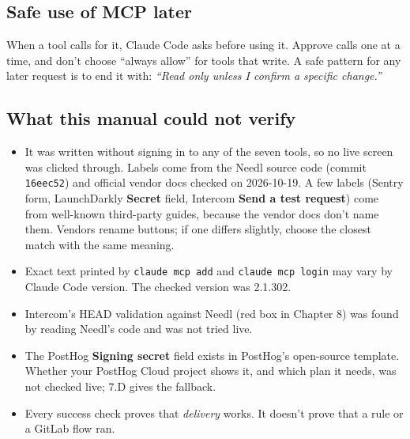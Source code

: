 \documentclass[11pt,a4paper]{article}
\newcommand{\ui}[1]{\textbf{#1}}
\newcommand{\lit}[1]{\texttt{#1}}
\begin{document}
\subsection{Safe use of MCP later}
When a tool calls for it, Claude Code asks before using it. Approve calls one at a time, and don't choose “always allow” for tools that write. A safe pattern for any later request is to end it with: \emph{“Read only unless I confirm a specific change.”}

\subsection{What this manual could not verify}
\begin{itemize}
\item It was written without signing in to any of the seven tools, so no live screen was clicked through. Labels come from the Needl source code (commit \lit{16eec52}) and official vendor docs checked on 2026-10-19. A few labels (Sentry form, LaunchDarkly \ui{Secret} field, Intercom \ui{Send a test request}) come from well-known third-party guides, because the vendor docs don't name them. Vendors rename buttons; if one differs slightly, choose the closest match with the same meaning.
\item Exact text printed by \lit{claude mcp add} and \lit{claude mcp login} may vary by Claude Code version. The checked version was 2.1.302.
\item Intercom's HEAD validation against Needl (red box in Chapter 8) was found by reading Needl's code and was not tried live.
\item The PostHog \ui{Signing secret} field exists in PostHog's open-source template. Whether your PostHog Cloud project shows it, and which plan it needs, was not checked live; 7.D gives the fallback.
\item Every success check proves that \emph{delivery} works. It doesn't prove that a rule or a GitLab flow ran.
\end{itemize}
\end{document}
